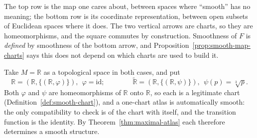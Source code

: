 \documentclass[11pt]{report}
\makeatletter
\newcounter{excounter}[section]
\newcommand{\exlabel}[1]{\edef\@currentlabel{\arabic{section}.\arabic{excounter}}\label{#1}}
\newcommand{\leeref}[1]{\par\smallskip{\raggedleft\footnotesize\textsc{Lee}:\ #1\par}}
\makeatother
\begin{document}
The top row is the map one cares about, between spaces where ``smooth'' has no meaning; the bottom row is its coordinate representation, between open subsets of Euclidean spaces where it does. The two vertical arrows are charts, so they are homeomorphisms, and the square commutes by construction. Smoothness of $F$ is \emph{defined} by smoothness of the bottom arrow, and Proposition~\ref{prop:smooth-map-charts} says this does not depend on which charts are used to build it.

\begin{exbox}\exlabel{ex:two-structures-R}
Take $M = \mathbb{R}$ as a topological space in both cases, and put
\[
\mathbb{R} = (\mathbb{R}, \{(\mathbb{R}, \varphi)\}), \ \ \varphi = \mathrm{id}; \qquad\qquad
\widetilde{\mathbb{R}} = (\mathbb{R}, \{(\mathbb{R}, \psi)\}), \ \ \psi(p) = \sqrt[3]{p}.
\]
Both $\varphi$ and $\psi$ are homeomorphisms of $\mathbb{R}$ onto $\mathbb{R}$, so each is a legitimate chart (Definition~\ref{def:smooth-chart}), and a one-chart atlas is automatically smooth: the only compatibility to check is of the chart with itself, and the transition function is the identity. By Theorem~\ref{thm:maximal-atlas} each therefore determines a smooth structure.
\leeref{Example 1.23}
\end{exbox}
\end{document}
